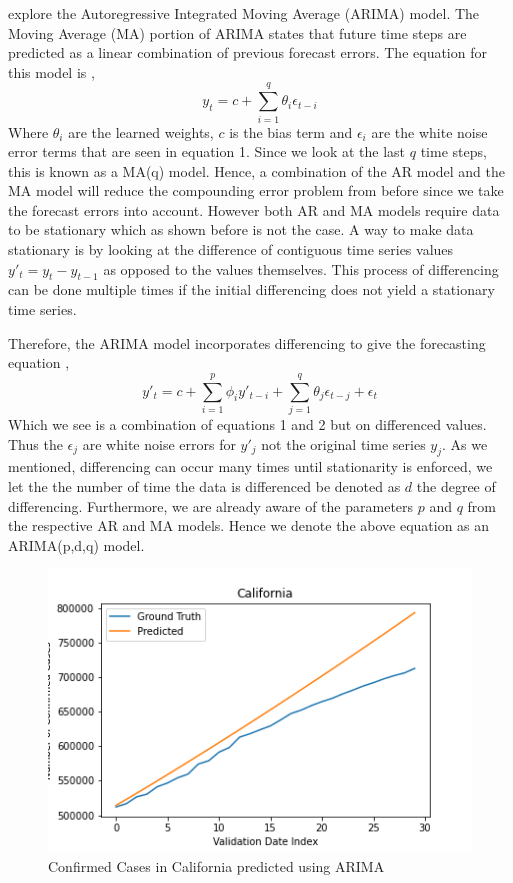 \documentclass[sigconf,nonacm]{acmart}
\begin{document}
explore the Autoregressive Integrated Moving Average (ARIMA) model. The Moving Average (MA) portion of ARIMA states that 
future time steps are predicted as a linear combination of previous forecast errors. The equation for this model is \cite{forecasting},
\begin{equation}
y_t = c + \sum_{i=1}^{q} \theta_i \epsilon_{t-i}
\end{equation} 
Where $\theta_i$ are the learned weights, $c$ is the bias term and $\epsilon_i$ are the white noise error terms that are 
seen in equation 1. Since we look at the last $q$ time steps, this is known as a MA(q) model.
Hence, a combination of the AR model and the MA model will reduce the compounding error problem from before since we
take the forecast errors into account. However both AR and MA models require data to be stationary which as shown before is not
the case. A way to make data stationary is by looking at the difference of contiguous time series values $y'_t = y_t - y_{t-1}$
as opposed to the values themselves. This process of differencing can be done multiple times if the initial differencing does
not yield a stationary time series.

Therefore, the ARIMA model incorporates differencing to give the forecasting equation \cite{forecasting},
\begin{equation}
  y'_t = c + \sum_{i = 1}^{p} \phi_i y'_{t-i} + \sum_{j=1}^{q} \theta_j \epsilon_{t-j} + \epsilon_t
\end{equation}
Which we see is a combination of equations 1 and 2 but on differenced values. Thus the $\epsilon_j$ are white noise errors for
$y'_j$ not the original time series $y_j$. As we mentioned, differencing can occur many times until stationarity is enforced,
we let the the number of time the data is differenced be denoted as $d$ the degree of differencing. Furthermore, we are
already aware of the parameters $p$ and $q$ from the respective AR and MA models. Hence we denote the above equation as an
ARIMA(p,d,q) model. 

\begin{figure}
  \centering
  \includegraphics[width=\linewidth]{figures/Section2_ARIMA_Cali_Conf.png}
  \caption{Confirmed Cases in California predicted using ARIMA}
  \label{fig:ARIMA}
\end{figure}
\end{document}
